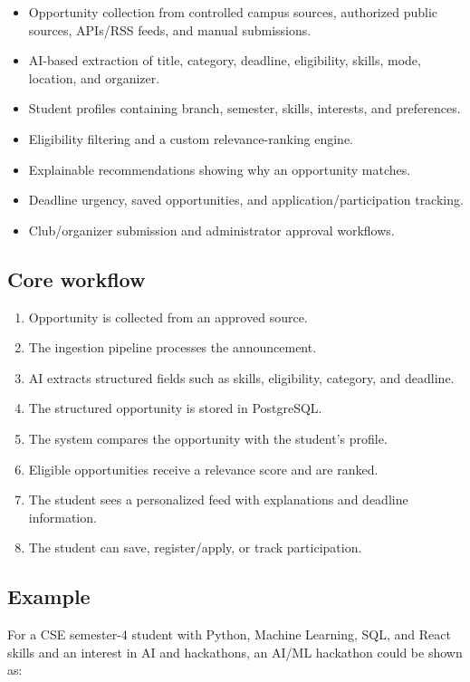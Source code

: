 \documentclass[11pt,a4paper]{article}
\begin{document}
\begin{itemize}
\item Opportunity collection from controlled campus sources, authorized public sources, APIs/RSS feeds, and manual submissions.
\item AI-based extraction of title, category, deadline, eligibility, skills, mode, location, and organizer.
\item Student profiles containing branch, semester, skills, interests, and preferences.
\item Eligibility filtering and a custom relevance-ranking engine.
\item Explainable recommendations showing why an opportunity matches.
\item Deadline urgency, saved opportunities, and application/participation tracking.
\item Club/organizer submission and administrator approval workflows.
\end{itemize}

\subsection{Core workflow}

\begin{enumerate}
\item Opportunity is collected from an approved source.
\item The ingestion pipeline processes the announcement.
\item AI extracts structured fields such as skills, eligibility, category, and deadline.
\item The structured opportunity is stored in PostgreSQL.
\item The system compares the opportunity with the student's profile.
\item Eligible opportunities receive a relevance score and are ranked.
\item The student sees a personalized feed with explanations and deadline information.
\item The student can save, register/apply, or track participation.
\end{enumerate}

\subsection{Example}

For a CSE semester-4 student with Python, Machine Learning, SQL, and React skills and an interest in AI and hackathons, an AI/ML hackathon could be shown as:
\end{document}
